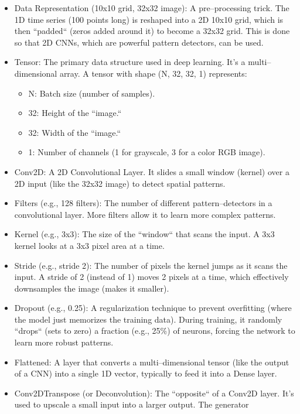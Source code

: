 \documentclass[12pt,a4paper]{report}
\numberwithin{equation}{section}
\begin{document}
\begin{itemize}
\item
  Data Representation (10x10 grid, 32x32 image): A pre--processing trick.
  The 1D time series (100 points long) is reshaped into a 2D 10x10 grid,
  which is then ``padded`` (zeros added around it) to become a 32x32 grid.
  This is done so that 2D CNNs, which are powerful pattern detectors,
  can be used.
\item
  Tensor: The primary data structure used in deep learning. It's a
  multi--dimensional array. A tensor with shape (N, 32, 32, 1)
  represents:

  \begin{itemize}
  \item
    N: Batch size (number of samples).
  \item
    32: Height of the ``image.``
  \item
    32: Width of the ``image.``
  \item
    1: Number of channels (1 for grayscale, 3 for a color RGB image).
  \end{itemize}
\item
  Conv2D: A 2D Convolutional Layer. It slides a small window (kernel)
  over a 2D input (like the 32x32 image) to detect spatial patterns.
\item
  Filters (e.g., 128 filters): The number of different pattern--detectors
  in a convolutional layer. More filters allow it to learn more complex
  patterns.
\item
  Kernel (e.g., 3x3): The size of the ``window`` that scans the input. A
  3x3 kernel looks at a 3x3 pixel area at a time.
\item
  Stride (e.g., stride 2): The number of pixels the kernel jumps as it
  scans the input. A stride of 2 (instead of 1) moves 2 pixels at a
  time, which effectively downsamples the image (makes it smaller).
\item
  Dropout (e.g., 0.25): A regularization technique to prevent
  overfitting (where the model just memorizes the training data). During
  training, it randomly ``drops`` (sets to zero) a fraction (e.g., 25\%)
  of neurons, forcing the network to learn more robust patterns.
\item
  Flattened: A layer that converts a multi--dimensional tensor (like the
  output of a CNN) into a single 1D vector, typically to feed it into a
  Dense layer.
\item
  Conv2DTranspose (or Deconvolution): The ``opposite`` of a Conv2D layer.
  It's used to upscale a small input into a larger output. The generator

\end{itemize}
\end{document}
